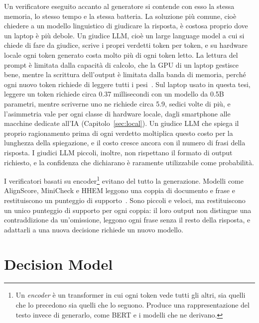 Un verificatore eseguito accanto al generatore si contende con esso la stessa memoria, lo stesso tempo e la stessa
batteria. La soluzione più comune, cioè chiedere a un modello linguistico di giudicare la risposta, è costosa proprio
dove un laptop è più debole. Un giudice LLM, cioè un large language model a cui si chiede di fare da giudice, scrive i propri verdetti token per token, e su hardware locale ogni token generato
costa molto più di ogni token letto. La lettura del prompt è limitata dalla capacità di calcolo, che la GPU di un laptop
gestisce bene, mentre la scrittura dell'output è limitata dalla banda di memoria, perché ogni nuovo token richiede di
leggere tutti i pesi~\cite{pope2023scaling}. Sul laptop usato in questa tesi, leggere un token richiede circa 0.37
millisecondi con un modello da 0.5B parametri, mentre scriverne uno ne richiede circa 5.9, sedici volte di più, e
l'asimmetria vale per ogni classe di hardware locale, dagli smartphone alle macchine dedicate all'IA
(Capitolo~\ref{sec:local}). Un giudice LLM che spiega il proprio ragionamento prima di ogni verdetto moltiplica questo costo per la lunghezza della
spiegazione, e il costo cresce ancora con il numero di frasi della risposta. I giudici LLM piccoli, inoltre, non rispettano
il formato di output richiesto, e la confidenza che dichiarano è raramente utilizzabile come probabilità.

I verificatori basati su encoder\footnote{Un \emph{encoder} è un transformer in cui ogni token vede tutti gli altri, sia quelli che lo precedono sia quelli che lo seguono. Produce una rappresentazione del testo invece di generarlo, come BERT e i modelli che ne derivano.} evitano del tutto la generazione. Modelli come AlignScore, MiniCheck e HHEM leggono una
coppia di documento e frase e restituiscono un punteggio di supporto~\cite{zha2023alignscore,tang2024minicheck,vectara2024hhem}.
Sono piccoli e veloci, ma restituiscono un unico punteggio di supporto per ogni coppia: il loro output non distingue una contraddizione da un'omissione, leggono ogni frase senza il resto della risposta, e adattarli a una nuova decisione
richiede un nuovo modello.

\section{Decision Model}
\label{sec:intro-systemone}


